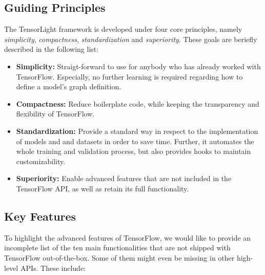 \subsection{Guiding Principles}

The TensorLight framework is developed under four core principles, namely \textit{simplicity}, \textit{compactness}, \textit{standardization} and \textit{superiority}. These goals are beriefly described in the following list:

\begin{itemize}
\item \textbf{Simplicity:} Straigt-forward to use for anybody who has already worked with TensorFlow. Especially, no further learning is required regarding how to define a model's graph definition.
\item \textbf{Compactness:} Reduce boilerplate code, while keeping the transparency and flexibility of TensorFlow. 
\item \textbf{Standardization:} Provide a standard way in respect to the implementation of models and and datasets in order to save time. Further, it automates the whole training and validation process, but also provides hooks to maintain customizability.
\item \textbf{Superiority:} Enable advanced features that are not included in the TensorFlow API, as well as retain its full functionality.
\end{itemize}


\subsection{Key Features}

To highlight the advanced features of TensorFlow, we would like to provide an incomplete list of the ten main functionalities that are not shipped with TensorFlow out-of-the-box. Some of them might even be missing in other high-level APIs. These include:

